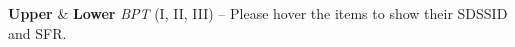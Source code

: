 \textbf{\label{fig:3}} \textbf{Upper} & \textbf{Lower} \textit{BPT} (I, II, III) – Please hover the items to show their SDSSID and SFR.